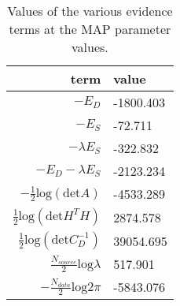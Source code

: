 \begin{table*}[!htb]\caption{Values of the various evidence terms at the MAP parameter values.}\begin{center}\begin{tabular}{ r l } term & value \\
\hline $-E_D$                                                & -1800.403 \\ 
 $-E_S$                                                & -72.711 \\ 
 $-\lambda E_S$                                        & -322.832 \\ 
 $-E_D - \lambda E_S$                                  & -2123.234 \\ 
 $-\frac{1}{2} \textrm{log} (\textrm{det} A )$         & -4533.289 \\ 
 $ \frac{1}{2} \textrm{log} (\textrm{det} H^TH )$      & 2874.578 \\ 
 $ \frac{1}{2} \textrm{log} (\textrm{det} C^{-1}_D )$  & 39054.695 \\ 
 $ \frac{N_{source}}{2} \textrm{log} \lambda$          & 517.901 \\ 
 $-\frac{N_{data}}{2} \textrm{log} 2\pi$               & -5843.076 \\ 
\hline\end{tabular}\end{center}\label{tab:2}\end{table*}
